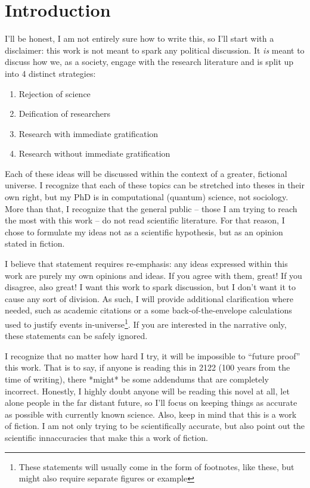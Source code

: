 \chapter*{Introduction}

I'll be honest, I am not entirely sure how to write this, so I'll start with a disclaimer: this work is not meant to spark any political discussion.
It \textit{is} meant to discuss how we, as a society, engage with the research literature and is split up into 4 distinct strategies:

\begin{enumerate}
\item Rejection of science
\item Deification of researchers
\item Research with immediate gratification
\item Research without immediate gratification
\end{enumerate}

Each of these ideas will be discussed within the context of a greater, fictional universe.
I recognize that each of these topics can be stretched into theses in their own right, but my PhD is in computational (quantum) science, not sociology.
More than that, I recognize that the general public -- those I am trying to reach the most with this work -- do not read scientific literature.
For that reason, I chose to formulate my ideas not as a scientific hypothesis, but as an opinion stated in fiction.

I believe that statement requires re-emphasis: any ideas expressed within this work are purely my own opinions and ideas.
If you agree with them, great!
If you disagree, also great!
I want this work to spark discussion, but I don't want it to cause any sort of division.
As such, I will provide additional clarification where needed, such as academic citations or a some back-of-the-envelope calculations used to justify events in-universe\footnote{These statements will usually come in the form of footnotes, like these, but might also require separate figures or example}.
If you are interested in the narrative only, these statements can be safely ignored.

I recognize that no matter how hard I try, it will be impossible to ``future proof'' this work.
That is to say, if anyone is reading this in 2122 (100 years from the time of writing), there *might* be some addendums that are completely incorrect.
Honestly, I highly doubt anyone will be reading this novel at all, let alone people in the far distant future, so I'll focus on keeping things as accurate as possible with currently known science.
Also, keep in mind that this is a work of fiction.
I am not only trying to be scientifically accurate, but also point out the scientific innaccuracies that make this a work of fiction.

